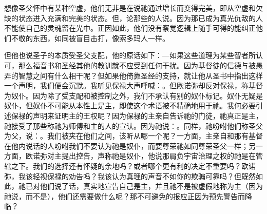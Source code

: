 想像圣父怀中有某种空虚，他们无非是在说祂通过增长而变得完美，即从空虚和欠缺的状态进入充满和完美的状态。但，论那些的人说。因为那已成为真光仇敌的人不能使自己的灵魂留在光中。正因如此，他们没有察觉逻辑上随手可得的能纠正他们不敬的东西，如同被盲目击打，像索多玛人一样。\par

但他也说圣子的本质受圣父支配，他的原话如下：—如果这些道理为某些智者所认可，那么福音书和圣经其他的教训就不应受到任何干扰。因为基督徒的信德与被愚弄的智慧之间有什么相干呢？但如果他倚靠圣经的支持，就让他从圣书中指出这样一个声明，我们便会沉默。我听见保禄大声呼喊：。但欧诺弥却反对保禄，称基督为奴仆。因为除了受支配和被控制之外，我们不承认有别的奴仆标记。奴仆无疑是奴仆，但奴仆不可能从本性上是主，即使这个术语被不精确地用于祂。我何必要引述保禄的声明来证明主的王权呢？因为保禄的主亲自告诉祂的门徒，祂真正是主，祂接受了那些称祂为师傅和主的人的宣认。因为祂说：。同样，祂吩咐他们称圣父为父，说：。我们被夹在他们之间，该听从哪一个呢？一方面，主亲自和那有基督在他内说话的人吩咐我们不要认为祂是奴仆，而要尊荣祂如同尊荣圣父一样；另一方面，欧诺弥对主提出控告，声称祂是奴仆，他说那肩负宇宙治理之权的祂是在管辖之下。我们的选择还有怀疑的余地吗？或者哪个更有利的决定不重要吗？欧诺弥，我该轻视保禄的劝告吗？我该认为真理的声音不如你的欺骗可靠吗？但既然如此，祂已对他们说了话，真实地宣告自己是主，并且祂不是被虚假地称为主（因为祂说，而不是），他们还需要做什么呢？那不可避免的报应正因为预先警告而降临？\par

